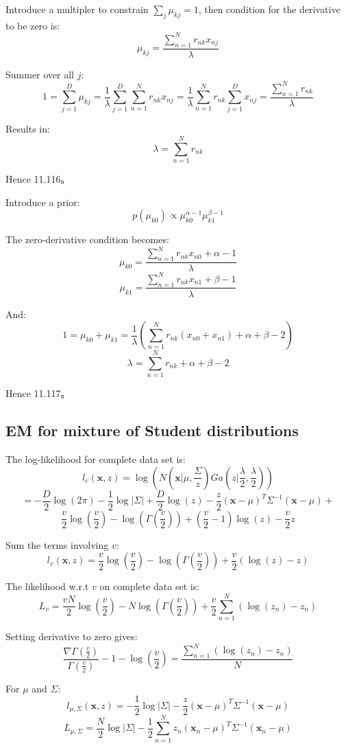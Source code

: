 \documentclass[UTF8]{ctexart}
\begin{document}
Introduce a multipler to constrain $\sum_{j}\mu_{kj}=1$, then condition for the derivative to be zero is:
$$\mu_{kj}=\frac{\sum_{n=1}^{N}r_{nk}x_{nj}}{\lambda}$$

Summer over all $j$:
$$1=\sum_{j=1}^{D}\mu_{kj} = \frac{1}{\lambda}\sum_{j=1}^{D}\sum_{n=1}^{N}r_{nk}x_{nj}=\frac{1}{\lambda}\sum_{n=1}^{N}r_{nk}\sum_{j=1}^{D}x_{nj}=\frac{\sum_{n=1}^{N}r_{nk}}{\lambda}$$

Results in:
$$\lambda = \sum_{n=1}^{N}r_{nk}$$

Hence 11.116。

Introduce a prior:
$$p(\mu_{k0})\propto \mu_{k0}^{\alpha-1}\mu_{k1}^{\beta-1}$$

The zero-derivative condition becomes:
$$\mu_{k0}=\frac{\sum_{n=1}^{N}r_{nk}x_{n0}+\alpha-1}{\lambda}$$
$$\mu_{k1}=\frac{\sum_{n=1}^{N}r_{nk}x_{n1}+\beta-1}{\lambda}$$

And:
$$1=\mu_{k0}+\mu_{k1}=\frac{1}{\lambda}(\sum_{n=1}^{N}r_{nk}(x_{n0}+x_{n1})+\alpha+\beta-2)$$
$$\lambda = \sum_{n=1}^{N}r_{nk}+\alpha+\beta-2$$

Hence 11.117。

\subsection{EM for mixture of Student distributions}
The log-likelihood for complete data set is:
$$l_{c}(\textbf{x},z)=\log(N(\textbf{x}|\mu,\frac{\Sigma}{z})Ga(z|\frac{\lambda}{2},\frac{\lambda}{2}))$$
$$=-\frac{D}{2}\log(2\pi)-\frac{1}{2}\log|\Sigma|+\frac{D}{2}\log(z)-\frac{z}{2}(\textbf{x}-\mu)^{T}\Sigma^{-1}(\textbf{x}-\mu)+$$
$$\frac{v}{2}\log (\frac{v}{2}) -\log(\Gamma(\frac{v}{2}))+(\frac{v}{2}-1)\log (z) - \frac{v}{2}z$$

Sum the terms involving $v$:
$$l_{v}(\textbf{x},z)=\frac{v}{2}\log(\frac{v}{2})-\log(\Gamma(\frac{v}{2}))+\frac{v}{2}(\log(z)-z)$$

The likelihood w.r.t $v$ on complete data set is:
$$L_{v}=\frac{vN}{2}\log(\frac{v}{2})-N\log(\Gamma(\frac{v}{2}))+\frac{v}{2}\sum_{n=1}^{N}(\log(z_{n})-z_{n})$$

Setting derivative to zero gives:
$$\frac{\nabla\Gamma(\frac{v}{2})}{\Gamma(\frac{v}{2})}-1-\log(\frac{v}{2})=\frac{\sum_{n=1}^{N}(\log(z_{n})-z_{n})}{N}$$

For $\mu$ and $\Sigma$:
$$l_{\mu,\Sigma}(\textbf{x},z)=-\frac{1}{2}\log|\Sigma|-\frac{z}{2}(\textbf{x}-\mu)^{T}\Sigma^{-1}(\textbf{x}-\mu)$$
$$L_{\mu,\Sigma}=\frac{N}{2}\log|\Sigma|-\frac{1}{2}\sum_{n=1}^{N}z_{n}(\textbf{x}_{n}-\mu)^{T}\Sigma^{-1}(\textbf{x}_{n}-\mu)$$
\end{document}
